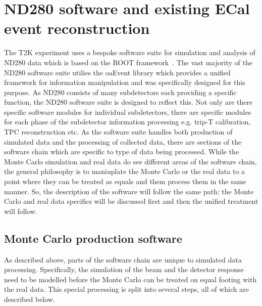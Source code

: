 


\chapter{ND280 software and existing ECal event reconstruction}
\label{chap:ND280Software}
The T2K experiment uses a bespoke software suite for simulation and analysis of ND280 data which is based on the ROOT framework~\cite{Brun199781}.  The vast majority of the ND280 software suite utilies the oaEvent library which provides a unified framework for information manipulation and was specifically designed for this purpose.
As ND280 consists of many subdetectors each providing a specific function, the ND280 software suite is designed to reflect this.  Not only are there specific software modules for individual subdetectors, there are specific modules for each phase of the subdetector information processing e.g. trip-T calibration, TPC reconstruction etc.  \newline
As the software suite handles both production of simulated data and the processing of collected data, there are sections of the software chain which are specific to type of data being processed.  While the Monte Carlo simulation and real data do see different areas of the software chain, the general philosophy is to maniuplate the Monte Carlo or the real data to a point where they can be treated as equals and them process them in the same manner.  So, the description of the software will follow the same path: the Monte Carlo and real data specifics will be discussed first and then the unified treatment will follow. 
\section{Monte Carlo production software}
\label{sec:MCchain}
As described above, parts of the software chain are unique to simulated data processing.  Specifically, the simulation of the beam and the detector response need to be modelled before the Monte Carlo can be treated on equal footing with the real data.  This special processing is split into several steps, all of which are described below.

